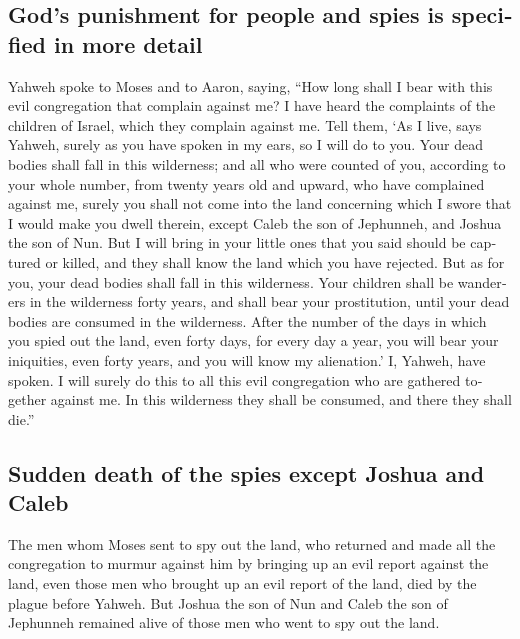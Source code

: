 \begin{paracol}{2}
\begin{otherlanguage}{english}
\hypertarget{gods-punishment-for-people-and-spies-is-specified-in-more-detail}{%
\subsection{God's punishment for people and spies is specified in more
detail}\label{gods-punishment-for-people-and-spies-is-specified-in-more-detail}}

 Yahweh spoke to Moses and to Aaron, saying,
 ``How long shall I bear with this evil congregation that
complain against me? I have heard the complaints of the children of
Israel, which they complain against me.  Tell them, `As I
live, says Yahweh, surely as you have spoken in my ears, so I will do to
you.  Your dead bodies shall fall in this wilderness; and
all who were counted of you, according to your whole number, from twenty
years old and upward, who have complained against me, 
surely you shall not come into the land concerning which I swore that I
would make you dwell therein, except Caleb the son of Jephunneh, and
Joshua the son of Nun.  But I will bring in your little
ones that you said should be captured or killed, and they shall know the
land which you have rejected.  But as for you, your dead
bodies shall fall in this wilderness.  Your children
shall be wanderers in the wilderness forty years, and shall bear your
prostitution, until your dead bodies are consumed in the wilderness.
 After the number of the days in which you spied out the
land, even forty days, for every day a year, you will bear your
iniquities, even forty years, and you will know my alienation.'
 I, Yahweh, have spoken. I will surely do this to all
this evil congregation who are gathered together against me. In this
wilderness they shall be consumed, and there they shall die.''

\hypertarget{sudden-death-of-the-spies-except-joshua-and-caleb}{%
\subsection{Sudden death of the spies except Joshua and
Caleb}\label{sudden-death-of-the-spies-except-joshua-and-caleb}}

 The men whom Moses sent to spy out the land, who
returned and made all the congregation to murmur against him by bringing
up an evil report against the land,  even those men who
brought up an evil report of the land, died by the plague before Yahweh.
 But Joshua the son of Nun and Caleb the son of Jephunneh
remained alive of those men who went to spy out the land.


\end{otherlanguage}
\end{paracol}
